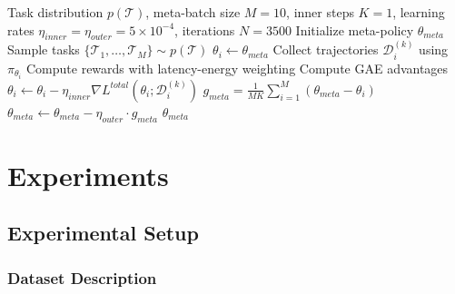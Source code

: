 \documentclass[journal,twoside]{IEEEtran}
\newcommand{\method}{\textsc{MARGO}}
\begin{document}
    \begin{algorithm}[t]
\caption{\method{} Meta-Training}
    \label{alg:margo}
    \begin{algorithmic}[1]
\REQUIRE Task distribution $p(\mathcal{T})$, meta-batch size $M=10$, inner steps $K=1$, learning rates $\eta_{inner}=\eta_{outer}=5\times10^{-4}$, iterations $N=3500$
\STATE Initialize meta-policy $\theta_{meta}$
    \STATE Sample tasks $\{\mathcal{T}_1, \ldots, \mathcal{T}_M\} \sim p(\mathcal{T})$
        \STATE $\theta_i \leftarrow \theta_{meta}$
            \STATE Collect trajectories $\mathcal{D}_i^{(k)}$ using $\pi_{\theta_i}$
            \STATE Compute rewards with latency-energy weighting
            \STATE Compute GAE advantages
            \STATE $\theta_i \leftarrow \theta_i - \eta_{inner} \nabla L^{total}(\theta_i; \mathcal{D}_i^{(k)})$
    \ENDFOR
    \ENDFOR
    \STATE $g_{meta} = \frac{1}{MK} \sum_{i=1}^{M} (\theta_{meta} - \theta_i)$
    \STATE $\theta_{meta} \leftarrow \theta_{meta} - \eta_{outer} \cdot g_{meta}$
    \ENDFOR
\RETURN $\theta_{meta}$
    \end{algorithmic}
    \end{algorithm}

\section{Experiments}
\label{sec:experiments}

\subsection{Experimental Setup}

\subsubsection{Dataset Description}
\end{document}

